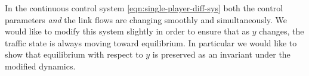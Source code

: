 In the continuous control system \eqref{eqn:single-player-diff-sys} both the control parameters \textit{and} the link flows are changing smoothly and simultaneously. 
We would like to modify this system slightly in order to ensure that as $y$ changes, the traffic state is always moving toward equilibrium.
In particular we would like to show that equilibrium with respect to $y$ is preserved as an invariant under the modified dynamics.